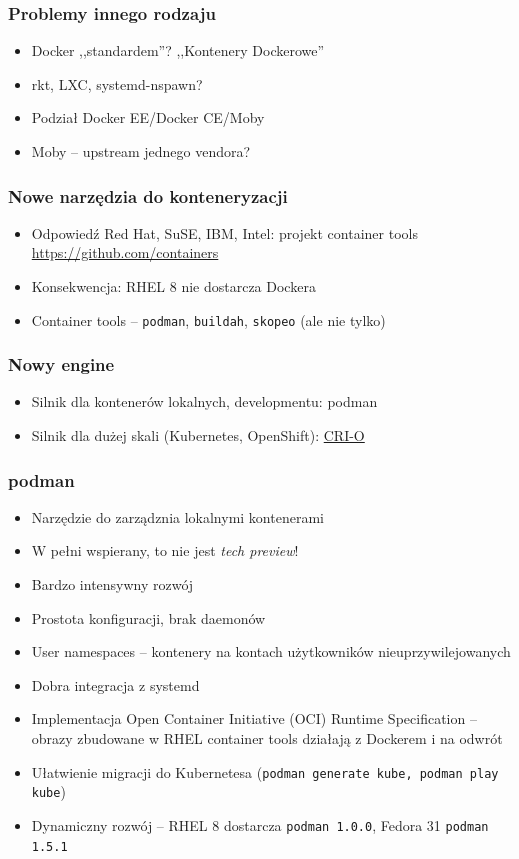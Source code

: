 \documentclass[dvipsnames,table]{beamer}
\begin{document}
\begin{frame}
	\frametitle{Problemy innego rodzaju}
	\begin{itemize}
		\item Docker ,,standardem''? ,,Kontenery Dockerowe''
		\item rkt, LXC, systemd-nspawn?
		\item Podział Docker EE/Docker CE/Moby
		\item Moby -- upstream jednego vendora?
	\end{itemize}
\end{frame}

\begin{frame}
	\frametitle{Nowe narzędzia do konteneryzacji}
	\begin{itemize}
		\item Odpowiedź Red Hat, SuSE, IBM, Intel: projekt container tools \url{https://github.com/containers} 
		\item Konsekwencja: RHEL 8 nie dostarcza Dockera
		\item Container tools -- {\tt podman}, {\tt buildah}, {\tt skopeo} (ale nie tylko)
\end{itemize}
\end{frame}

\begin{frame}
	\frametitle{Nowy engine}
	\begin{itemize}
		\item Silnik dla kontenerów lokalnych, developmentu: podman
		\item Silnik dla dużej skali (Kubernetes, OpenShift): \href{https://cri-o.io/}{CRI-O}
	\end{itemize}
\end{frame}


\begin{frame}
	\frametitle{podman}
	\begin{itemize}
		\item Narzędzie do zarządznia lokalnymi kontenerami
		\item W pełni wspierany, to nie jest {\em tech preview}!
		\item Bardzo intensywny rozwój
		\item Prostota konfiguracji, brak daemonów
		\item User namespaces -- kontenery na kontach użytkowników nieuprzywilejowanych
		\item Dobra integracja z systemd
		\item Implementacja Open Container Initiative (OCI) Runtime Specification -- obrazy zbudowane w RHEL container tools działają z Dockerem i na odwrót
		\item Ułatwienie migracji do Kubernetesa ({\tt podman generate kube, podman play kube})
		\item Dynamiczny rozwój -- RHEL 8 dostarcza {\tt podman 1.0.0}, Fedora 31 {\tt podman 1.5.1}
	\end{itemize}
\end{frame}
\end{document}
